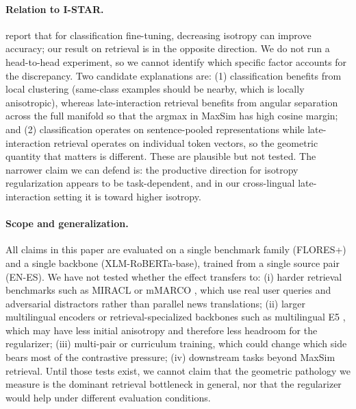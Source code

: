 \paragraph{Relation to I-STAR.} \citet{rudman2024istar} report that for classification fine-tuning, decreasing isotropy can improve accuracy; our result on retrieval is in the opposite direction. We do not run a head-to-head experiment, so we cannot identify which specific factor accounts for the discrepancy. Two candidate explanations are: (1) classification benefits from local clustering (same-class examples should be nearby, which is locally anisotropic), whereas late-interaction retrieval benefits from angular separation across the full manifold so that the argmax in MaxSim has high cosine margin; and (2) classification operates on sentence-pooled representations while late-interaction retrieval operates on individual token vectors, so the geometric quantity that matters is different. These are plausible but not tested. The narrower claim we can defend is: the productive direction for isotropy regularization appears to be task-dependent, and in our cross-lingual late-interaction setting it is toward higher isotropy.

\paragraph{Scope and generalization.} All claims in this paper are evaluated on a single benchmark family (FLORES+) and a single backbone (XLM-RoBERTa-base), trained from a single source pair (EN-ES). We have not tested whether the effect transfers to: (i) harder retrieval benchmarks such as MIRACL \citep{zhang2023miracl} or mMARCO \citep{bonifacio2021mmarco}, which use real user queries and adversarial distractors rather than parallel news translations; (ii) larger multilingual encoders or retrieval-specialized backbones such as multilingual E5 \citep{wang2024me5}, which may have less initial anisotropy and therefore less headroom for the regularizer; (iii) multi-pair or curriculum training, which could change which side bears most of the contrastive pressure; (iv) downstream tasks beyond MaxSim retrieval. Until those tests exist, we cannot claim that the geometric pathology we measure is the dominant retrieval bottleneck in general, nor that the regularizer would help under different evaluation conditions.

